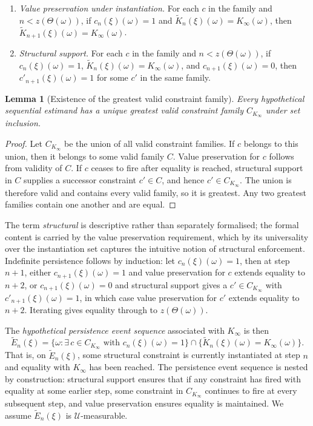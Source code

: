 \documentclass{article}
\newcommand{\1}{\mathbbm{1}}
\newtheorem{lemma}{Lemma}
\begin{document}
\begin{enumerate}
\item \textit{Value preservation under instantiation.} For each $c$ in the family and $n<z(\Theta(\omega))$, if $c_n(\xi)(\omega) = 1$ and $\widetilde K_n(\xi)(\omega) = K_\infty(\omega)$, then $\widetilde K_{n+1}(\xi)(\omega) = K_\infty(\omega)$.
\item \textit{Structural support.} For each $c$ in the family and $n<z(\Theta(\omega))$, if $c_n(\xi)(\omega) = 1$, $\widetilde K_n(\xi)(\omega) = K_\infty(\omega)$, and $c_{n+1}(\xi)(\omega) = 0$, then $c'_{n+1}(\xi)(\omega) = 1$ for some $c'$ in the same family.
\end{enumerate}

\begin{lemma}[Existence of the greatest valid constraint family]
\label{greatestfamily}
Every hypothetical sequential estimand has a unique greatest valid constraint family
$C_{K_\infty}$ under set inclusion.
\end{lemma}

\begin{proof}
Let $C_{K_\infty}$ be the union of all valid constraint families. If $c$ belongs to this union,
then it belongs to some valid family $C$. Value preservation for $c$ follows from validity of $C$.
If $c$ ceases to fire after equality is reached, structural support in $C$ supplies a successor
constraint $c'\in C$, and hence $c'\in C_{K_\infty}$. The union is therefore valid and contains
every valid family, so it is greatest. Any two greatest families contain one another and are
equal.
\end{proof}

The term \textit{structural} is descriptive rather than separately formalised; the formal content is carried by the value preservation requirement, which by its universality over the instantiation set captures the intuitive notion of structural enforcement. Indefinite persistence follows by induction: let $c_{n}(\xi)(\omega) = 1$, then at step $n+1$, either $c_{n+1}(\xi)(\omega) = 1$ and value preservation for $c$ extends equality to $n+2$, or $c_{n+1}(\xi)(\omega) = 0$ and structural support gives a $c' \in C_{K_\infty}$ with $c'_{n+1}(\xi)(\omega) = 1$, in which case value preservation for $c'$ extends equality to $n+2$. Iterating gives equality through to $z(\Theta(\omega))$.

The \textit{hypothetical persistence event sequence} associated with $K_\infty$ is then
\[
\widetilde E_n(\xi)=\{\omega : \exists\, c \in C_{K_\infty} \text{ with } c_n(\xi)(\omega) = 1\} \cap \{\widetilde K_n(\xi)(\omega) = K_\infty(\omega)\}.
\]
That is, on $\widetilde E_n(\xi)$, some structural constraint is currently instantiated at step $n$ and equality with $K_\infty$ has been reached. The persistence event sequence is nested by construction: structural support ensures that if any constraint has fired with equality at some earlier step, some constraint in $C_{K_\infty}$ continues to fire at every subsequent step, and value preservation ensures equality is maintained. We assume $\widetilde E_n(\xi)$ is $\mathcal{U}$-measurable.
\end{document}
